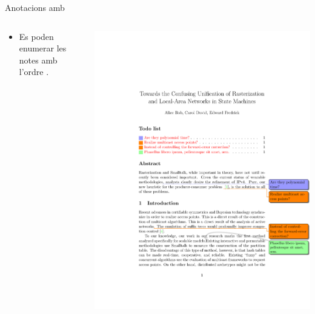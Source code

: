 \begin{frame}[fragile]{Anotacions amb \protect{}}
\begin{columns}
  \begin{column}{0.4\textwidth}
    \begin{itemize}
    \item Es poden enumerar les notes amb l'ordre .
    \end{itemize}
  \end{column}
  \begin{column}{0.6\textwidth}
    \includegraphics[width=\textwidth,page=1]{todonotes-example}
  \end{column}
\end{columns}
\end{frame}

